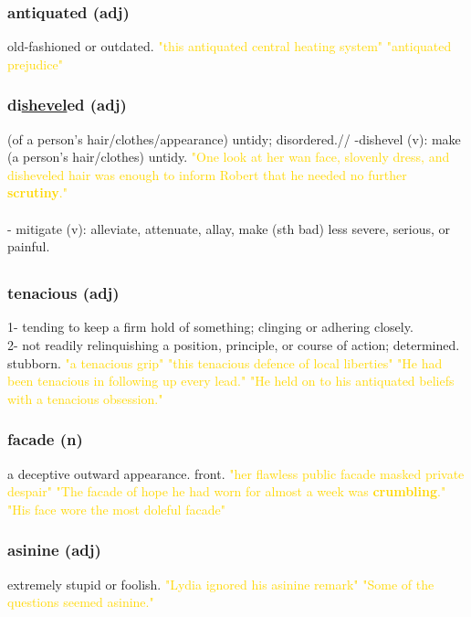 \documentclass{proc}
\begin{document}
	\subsubsection{\textcolor{brickred}{antiquated} (adj)}
	old-fashioned or outdated.
	\textcolor{gold}{"this antiquated central heating system" "antiquated prejudice"}
	
	\subsubsection{\textcolor{brickred}{di\underline{shevel}ed} (adj)}
	(of a person's hair/clothes/appearance) untidy; disordered.//
	-dishevel (v): make (a person's hair/clothes) untidy.
	\textcolor{gold}{"One look at her wan face, slovenly dress, and disheveled hair was enough to inform Robert that he  needed no further \textbf{scrutiny}."}\\\\
	- mitigate (v): alleviate, attenuate, allay, make (sth bad) less severe, serious, or painful.
	
	\newpage
	\subsection{}
	\subsubsection{\textcolor{brickred}{tenacious} (adj)}
	1- tending to keep a firm hold of something; clinging or adhering closely.\\
	2- not readily relinquishing a position, principle, or course of action; determined. stubborn.
	\textcolor{gold}{"a tenacious grip" "this tenacious defence of local liberties" "He had been tenacious in following up every lead." "He held on to his antiquated beliefs with a tenacious obsession."}
	
	\subsubsection{\textcolor{brickred}{facade} (n)}
	a deceptive outward appearance. front.
	\textcolor{gold}{"her flawless public facade masked private despair" "The facade of hope he had worn for almost a week  was \textbf{crumbling}." "His face wore the most doleful facade"}
	
	\subsubsection{\textcolor{brickred}{asinine} (adj)}
	extremely stupid or foolish.
	\textcolor{gold}{"Lydia ignored his asinine remark" "Some of the questions seemed asinine."}
	
\end{document}

